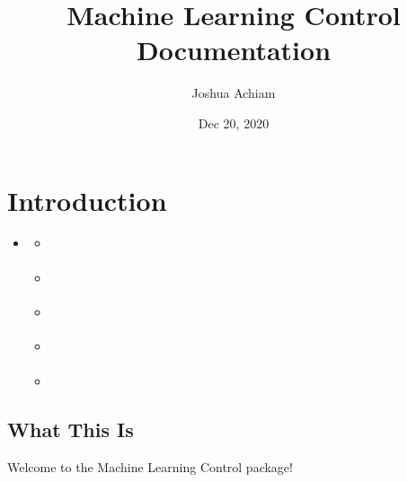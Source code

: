 \documentclass[letterpaper,10pt,english]{sphinxmanual}
\title{Machine Learning Control Documentation}
\date{Dec 20, 2020}
\author{Joshua Achiam}
\begin{document}
\pagestyle{empty}
\sphinxmaketitle
\pagestyle{plain}
\sphinxtableofcontents
\pagestyle{normal}
\label{\detokenize{index::doc}}


\noindent{}


\chapter{Introduction}
\label{\detokenize{user/introduction:introduction}}\label{\detokenize{user/introduction::doc}}
\begin{sphinxShadowBox}
\begin{itemize}
\item {} 
\label{\detokenize{user/introduction:id1}}{\hyperref[\detokenize{user/introduction:introduction}]{}}
\begin{itemize}
\item {} 
\label{\detokenize{user/introduction:id2}}{\hyperref[\detokenize{user/introduction:what-this-is}]{}}

\item {} 
\label{\detokenize{user/introduction:id3}}{\hyperref[\detokenize{user/introduction:why-we-built-this}]{}}

\item {} 
\label{\detokenize{user/introduction:id4}}{\hyperref[\detokenize{user/introduction:how-this-serves-our-mission}]{}}

\item {} 
\label{\detokenize{user/introduction:id5}}{\hyperref[\detokenize{user/introduction:code-design-philosophy}]{}}

\item {} 
\label{\detokenize{user/introduction:id6}}{\hyperref[\detokenize{user/introduction:long-term-support-and-support-history}]{}}

\end{itemize}

\end{itemize}
\end{sphinxShadowBox}


\section{What This Is}
\label{\detokenize{user/introduction:what-this-is}}
Welcome to the Machine Learning Control package!
\end{document}
